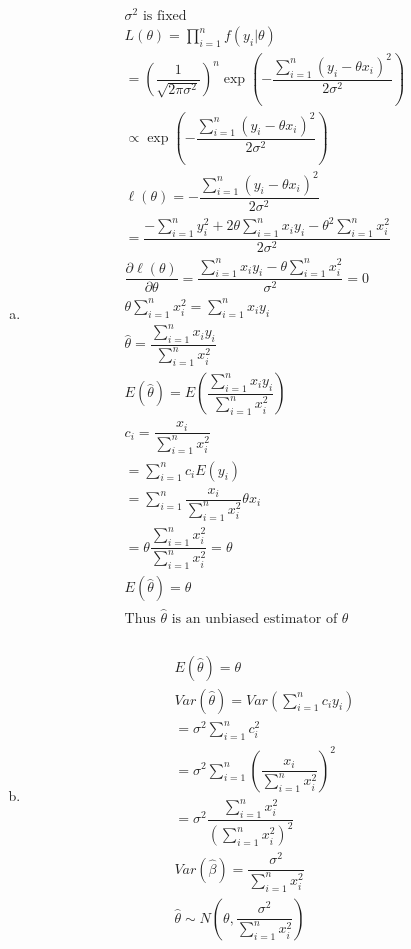 \documentclass{article}
\newcommand{\dll}[1]{\dfrac{\partial \ell({#1})}{\partial{#1}}}
\begin{document}
\begin{flushleft}
\begin{enumerate}[(a)]
	\item 
\begin{multline*}\\
\sigma^2 \text{ is fixed}\\
L(\theta)=\prod_{i=1}^{n}f(y_i|\theta)\\
=\left(\dfrac{1}{\sqrt{2\pi \sigma^2}}\right)^n \exp\left(-\dfrac{\sum_{i=1}^{n}(y_i-\theta x_i)^2}{2\sigma^2}\right)\\
\propto \exp\left(-\dfrac{\sum_{i=1}^{n}(y_i-\theta x_i)^2}{2\sigma^2}\right)\\
\ell(\theta)=-\dfrac{\sum_{i=1}^{n}(y_i-\theta x_i)^2}{2\sigma^2}\\
=\dfrac{-\sum_{i=1}^{n}y_i^2+2\theta \sum_{i=1}^{n}x_iy_i-\theta^2\sum_{i=1}^{n}x_i^2}{2\sigma^2}\\
\dll{\theta}=\dfrac{ \sum_{i=1}^{n}x_iy_i-\theta\sum_{i=1}^{n}x_i^2}{\sigma^2}=0\\
\theta\sum_{i=1}^{n}x_i^2=\sum_{i=1}^{n}x_iy_i\\
\hat{\theta}=\dfrac{\sum_{i=1}^{n}x_iy_i}{\sum_{i=1}^{n}x_i^2}\\
E(\hat{\theta})=E\left(\dfrac{\sum_{i=1}^{n}x_iy_i}{\sum_{i=1}^{n}x_i^2}\right)\\
c_i=\dfrac{x_i}{\sum_{i=1}^{n}x_i^2}\\
=\sum_{i=1}^{n}c_iE(y_i)\\
=\sum_{i=1}^{n}\dfrac{x_i}{\sum_{i=1}^{n}x_i^2}\theta x_i\\
=\theta \dfrac{\sum_{i=1}^{n}x_i^2}{\sum_{i=1}^{n}x_i^2}=\theta\\
E(\hat{\theta})=\theta\\
\text{Thus } \hat{\theta} \text{ is an unbiased estimator of } \theta\\
\end{multline*}
\pagebreak
	\item 
\begin{multline*}\\
E(\hat{\theta})=\theta\\
Var(\hat{\theta})=Var\left(\sum_{i=1}^{n}c_iy_i\right)\\
=\sigma^2\sum_{i=1}^{n}c_i^2\\
=\sigma^2\sum_{i=1}^{n}\left(\dfrac{x_i}{\sum_{i=1}^{n}x_i^2}\right)^2\\
=\sigma^2\dfrac{\sum_{i=1}^{n}x_i^2}{\left(\sum_{i=1}^{n}x_i^2\right)^2}\\
Var(\hat{\beta})=\dfrac{\sigma^2}{\sum_{i=1}^{n}x_i^2}\\
\hat{\theta}\sim N\left(\theta,\dfrac{\sigma^2}{\sum_{i=1}^{n}x_i^2}\right)\\
\end{multline*}


\end{enumerate}
\end{flushleft}
\end{document}
